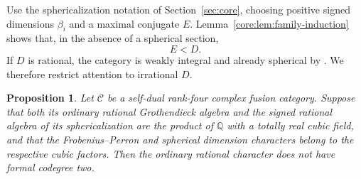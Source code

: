 \documentclass[11pt,a4paper]{article}
\newtheorem{proposition}[theorem]{Proposition}
\theoremstyle{definition}\newtheorem{definition}[theorem]{Definition}
\theoremstyle{remark}\newtheorem{remark}[theorem]{Remark}
\newcommand{\C}{\mathcal C}
\newcommand{\Q}{\mathbb Q}
\numberwithin{equation}{section}
\begin{document}
Use the sphericalization notation of Section~\ref{sec:core},
choosing positive signed dimensions $\beta_i$ and a maximal conjugate
$E$. Lemma~\ref{core:lem:family-induction} shows that, in the absence of a spherical section,
\begin{equation}\label{inv:eq:proper-signed-strict}E<D.\end{equation}
If $D$ is rational, the
category is weakly integral and already spherical by
\cite[Propositions~8.23--8.24]{ENO}. We therefore restrict attention
to irrational $D$.

\begin{proposition}\label{inv:prop:cubic-rational-two-impossible}
Let $\C$ be a self-dual rank-four complex fusion category. Suppose
that both its ordinary rational Grothendieck algebra and the signed
rational algebra of its sphericalization are the product of $\Q$
with a totally real cubic field, and that the Frobenius--Perron and
spherical dimension characters belong to the respective cubic factors.
Then the ordinary rational character does not have formal codegree two.
\end{proposition}
\end{document}
